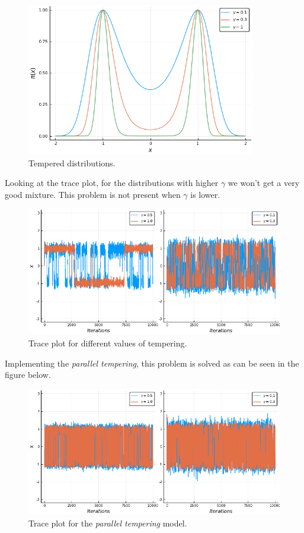 \documentclass[12pt,letterpaper]{article}
\begin{document}
    \begin{figure}[H]
        \centering
        \includegraphics[width=10cm]{images/Tempered.png}
        \caption{Tempered distributions.
        }
    \end{figure}


Looking at the trace plot, for the distributions
with higher $\gamma$ we 
won't get a very good mixture. This problem is not
present when $\gamma$ is lower.

    \begin{figure}[H]
        \centering
        \includegraphics[width=16cm]{images/Trace1.png}
        \caption{Trace plot for different values of tempering.}
    \end{figure}

Implementing the \textit{parallel tempering}, this problem is solved as
can be seen in the figure below.

    \begin{figure}[H]
        \centering
        \includegraphics[width=16cm]{images/Trace2.png}
        \caption{Trace plot for the \textit{parallel tempering} model.}
    \end{figure}
\end{document}

